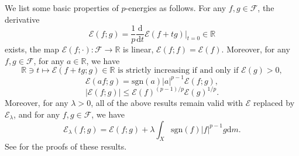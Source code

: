\documentclass[11pt,a4paper]{article}
\numberwithin{equation}{section}
\theoremstyle{plain}
\theoremstyle{definition}
\begin{document}
We list some basic properties of $p$-energies as follows. For any $f,g\in\mathcal{F}$, the derivative
$$\mathcal{E}(f;g)=\frac{1}{p}\frac{\mathrm{d}}{\mathrm{d} t}\mathcal{E}(f+tg)|_{t=0}\in\mathbb{R}$$
exists, the map $\mathcal{E}(f;\cdot):\mathcal{F}\to\mathbb{R}$ is linear, $\mathcal{E}(f;f)=\mathcal{E}(f)$. Moreover, for any $f,g\in\mathcal{F}$, for any $a\in\mathbb{R}$, we have
\begin{equation}\label{eq_quasi_strict}
\mathbb{R}\ni t\mapsto\mathcal{E}(f+tg;g)\in\mathbb{R}\text{ is strictly increasing if and only if }\mathcal{E}(g)>0,
\end{equation}
$$\mathcal{E}(af;g)=\mathrm{sgn}(a)|a|^{p-1}\mathcal{E}(f;g),$$
$$|\mathcal{E}(f;g)|\le\mathcal{E}(f)^{(p-1)/p}\mathcal{E}(g)^{1/p}.$$
Moreover, for any $\lambda>0$, all of the above results remain valid with $\mathcal{E}$ replaced by $\mathcal{E}_\lambda$, and for any $f,g\in\mathcal{F}$, we have
$$\mathcal{E}_\lambda(f;g)=\mathcal{E}(f;g)+\lambda\int_X\mathrm{sgn}(f)|f|^{p-1}g\mathrm{d} m.$$
See \cite[Theorem 3.7, Corollary 3.25]{KS24a} for the proofs of these results.
\end{document}
